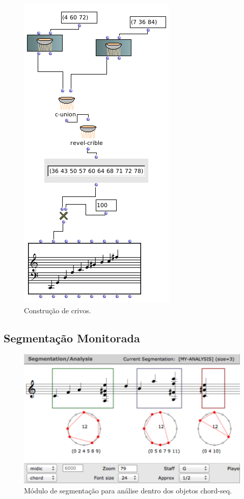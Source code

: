 \documentclass[
	12pt,				%
	openright,			%
	twoside,			%
	a4paper,			%
	english,			%
	french,				%
	spanish,			%
	brazil				%
	]{abntex2}
\begin{document}
\begin{figure}[!h]
	\caption{\label{fig_grafico}Construção de crivos. }
	\begin{center}
	    \includegraphics[scale=0.5]{OM_settheory/crivos.png}
	\end{center}
\end{figure}

\lipsum[8]






\pagebreak
\subsection{Segmentação Monitorada}


\begin{figure}[!h]
	\caption{\label{fig_grafico}Módulo de segmentação para análise dentro dos objetos chord-seq. }
	\begin{center}
	    \includegraphics[scale=0.35]{OMPD/segmentaOM.png}
	\end{center}
\end{figure}	
	
\end{document}
